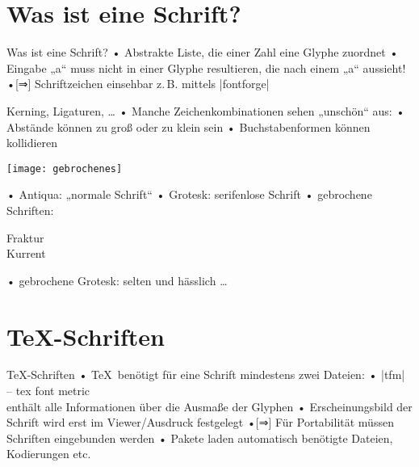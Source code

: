 
\section{Was ist eine Schrift?}
\begin{frame}[fragile]{Was ist eine Schrift?}
• Abstrakte Liste, die einer Zahl eine Glyphe zuordnet
• Eingabe „a“ muss nicht in einer Glyphe resultieren, die nach einem „a“ aussieht!
•[⇒] Schriftzeichen einsehbar z.\,B. mittels |fontforge|
\• 
\end{frame}

\begin{frame}{Kerning, Ligaturen, …}
• Manche Zeichenkombinationen sehen „unschön“ aus:
• Abstände können zu groß oder zu klein sein
• Buchstabenformen können kollidieren
\•
\end{frame}

\begin{frame}[plain]
\parbox[b]{.7\textwidth}{
\texttt{[image: gebrochenes]}%
}%
\parbox[b]{.3\textwidth}{
• Antiqua: \textrm{„normale Schrift“}
• Grotesk: \textsf{serifenlose Schrift}
• gebrochene Schriften: \parbox[t]{5cm}{%
 Fraktur\\%
\large Kurrent
}
• gebrochene Grotesk: selten und hässlich …
\•
\vspace*{2cm}
}
\end{frame}

\section{\TeX-Schriften}
\begin{frame}[fragile]{\TeX-Schriften}
• \TeX\ benötigt für eine Schrift mindestens zwei Dateien:
• |tfm| – tex font metric%
\\ enthält alle Informationen über die Ausmaße der Glyphen
• Erscheinungsbild der Schrift wird erst im Viewer/Ausdruck festgelegt
•[⇒] Für Portabilität müssen Schriften eingebunden werden
• Pakete laden automatisch benötigte Dateien, Kodierungen etc.
\• 
\end{frame}

